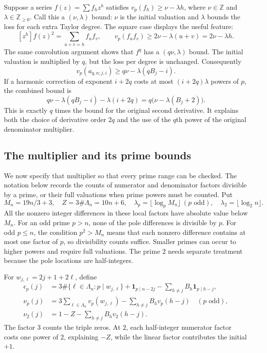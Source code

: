 \documentclass[11pt]{article}
\newcommand{\Z}{\mathbb Z}\newcommand{\Q}{\mathbb Q}
\newcommand{\ind}{\mathbf 1}
\begin{document}
Suppose a series $f(z)=\sum f_hz^h$ satisfies
$v_p(f_h)\ge\nu-\lambda h$, where $\nu\in\Z$ and
$\lambda\in\Z_{\ge0}$. Call this a $(\nu,\lambda)$ bound: $\nu$
is the initial valuation and $\lambda$ bounds the loss for each extra
Taylor degree. The square case displays the useful feature:
\[
 [z^h]f(z)^2=\sum_{u+v=h}f_uf_v,
 \qquad v_p(f_uf_v)\ge2\nu-\lambda(u+v)=2\nu-\lambda h.
\]
The same convolution argument shows that $f^q$ has a $(q\nu,\lambda)$
bound. The initial valuation is multiplied by $q$, but the loss per
degree is unchanged. Consequently
\begin{equation}\label{eq:powerlocal}
 v_p(a_{q,n;j,i})\ge q\nu-\lambda(qB_j-i).
\end{equation}
If a harmonic correction of exponent $i+2q$ costs at most
$(i+2q)\lambda$ powers of $p$, the combined bound is
\begin{equation}\label{eq:costcancel}
 q\nu-\lambda(qB_j-i)-\lambda(i+2q)
       =q\bigl(\nu-\lambda(B_j+2)\bigr).
\end{equation}
This is exactly $q$ times the bound for the original second derivative.
It explains both the choice of derivative order $2q$ and the use of the
$q$th power of the original denominator multiplier.

\subsection{The multiplier and its prime bounds}
We now specify that multiplier so that every prime range can be checked.
The notation below records the counts of numerator and denominator
factors divisible by a prime, or their full valuations when prime powers
must be counted. Put
\[
 M_n=19n/3+3,\quad Z=3\#\Lambda_n=10n+6,\quad
 \lambda_p=\lfloor\log_pM_n\rfloor\ (p\text{ odd}),\quad
 \lambda_2=\lfloor\log_2n\rfloor.
\]
All the nonzero integer differences in these local factors have
absolute value below $M_n$. For an odd prime $p>n$, none of the pole
differences is divisible by $p$. For odd $p\le n$, the condition
$p^2>M_n$ means that each nonzero difference contains at most one factor
of $p$, so divisibility counts suffice. Smaller primes can occur to
higher powers and require full valuations. The prime $2$ needs separate
treatment because the pole locations are half-integers.

For $w_{j,\ell}=2j+1+2\ell$, define
\begin{align*}
 \epsilon_p(j)&=3\#\{\ell\in\Lambda_n:p\mid w_{j,\ell}\}
 +\ind_{p\mid n-2j}-\sum_{h\ne j}B_h\ind_{p\mid h-j},\\
 \nu_p(j)&=3\sum_{\ell\in\Lambda_n}v_p(w_{j,\ell})
             -\sum_{h\ne j}B_hv_p(h-j)\quad(p\text{ odd}),\\
 \nu_2(j)&=1-Z-\sum_{h\ne j}B_hv_2(h-j).
\end{align*}
The factor $3$ counts the triple zeros. At $2$, each half-integer
numerator factor costs one power of $2$, explaining $-Z$, while the
linear factor contributes the initial $+1$.
\end{document}
